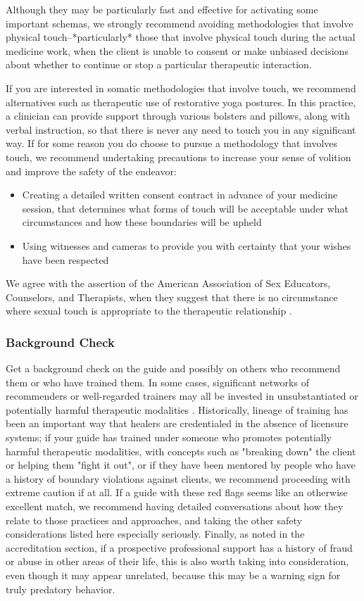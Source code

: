 \documentclass[12pt,letterpaper]{book}
\begin{document}
Although they may be particularly fast and effective for activating some important schemas, we strongly recommend avoiding methodologies that involve physical touch–*particularly* those that involve physical touch during the actual medicine work, when the client is unable to consent or make unbiased decisions about whether to continue or stop a particular therapeutic interaction.

If you are interested in somatic methodologies that involve touch, we recommend alternatives such as therapeutic use of restorative yoga postures. In this practice, a clinician can provide support through various bolsters and pillows, along with verbal instruction, so that there is never any need to touch you in any significant way. If for some reason you do choose to pursue a methodology that involves touch, we recommend undertaking precautions to increase your sense of volition and improve the safety of the endeavor:
\begin{itemize}
    \item Creating a detailed written consent contract in advance of your medicine session, that determines what forms of touch will be acceptable under what circumstances and how these boundaries will be upheld
    \item Using witnesses and cameras to provide you with certainty that your wishes have been respected
\end{itemize}
We agree with the assertion of the American Association of Sex Educators, Counselors, and Therapists, when they suggest that there is no circumstance where sexual touch is appropriate to the therapeutic relationship \cite{aasectTouch}. 

\subsubsection*{Background Check}
Get a background check on the guide and possibly on others who recommend them or who have trained them. In some cases, significant networks of recommenders or well-regarded trainers may all be invested in unsubstantiated or potentially harmful therapeutic modalities \cite{powerTrip}. Historically, lineage of training has been an important way that healers are credentialed in the absence of licensure systems; if your guide has trained under someone who promotes potentially harmful therapeutic modalities, with concepts such as "breaking down" the client or helping them "fight it out", or if they have been mentored by people who have a history of boundary violations against clients, we recommend proceeding with extreme caution if at all. If a guide with these red flags seems like an otherwise excellent match, we recommend having detailed conversations about how they relate to those practices and approaches, and taking the other safety considerations listed here especially seriously. Finally, as noted in the accreditation section, if a prospective professional support has a history of fraud or abuse in other areas of their life, this is also worth taking into consideration, even though it may appear unrelated, because this may be a warning sign for truly predatory behavior. 
\end{document}
